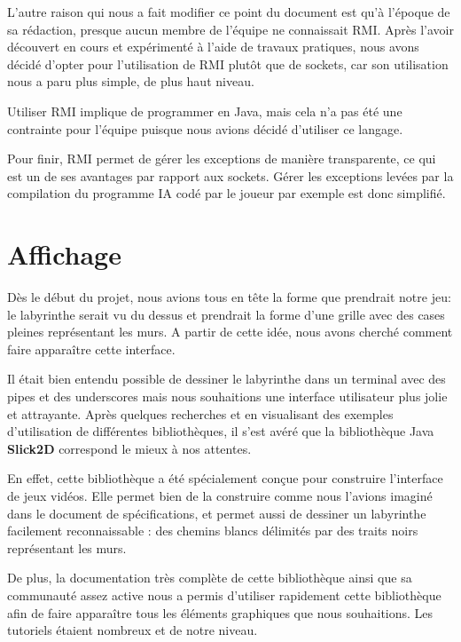 	L'autre raison qui nous a fait modifier ce point du document est qu'à l'époque de sa rédaction, presque aucun membre de l'équipe ne connaissait RMI. Après l'avoir découvert en cours et expérimenté à l'aide de travaux pratiques, nous avons décidé d'opter pour l'utilisation de RMI plutôt que de sockets, car son utilisation nous a paru plus simple, de plus haut niveau.

	Utiliser RMI implique de programmer en Java, mais cela n'a pas été une contrainte pour l'équipe puisque nous avions décidé d'utiliser ce langage.

	Pour finir, RMI permet de gérer les exceptions de manière transparente, ce qui est un de ses avantages par rapport aux sockets. Gérer les exceptions levées par la compilation du programme IA codé par le joueur par exemple est donc simplifié.


\section{Affichage}

	Dès le début du projet, nous avions tous en tête la forme que prendrait notre jeu: le labyrinthe serait vu du dessus et prendrait la forme d'une grille avec des cases pleines représentant les murs. A partir de cette idée, nous avons cherché comment faire apparaître cette interface.

	Il était bien entendu possible de dessiner le labyrinthe dans un terminal avec des pipes et des underscores mais nous souhaitions une interface utilisateur plus jolie et attrayante. Après quelques recherches et en visualisant des exemples d'utilisation de différentes bibliothèques, il s'est avéré que la bibliothèque Java \textbf{Slick2D} correspond le mieux à nos attentes.

  En effet, cette bibliothèque a été spécialement conçue pour construire l'interface de jeux vidéos. Elle permet bien de la construire comme nous l'avions imaginé dans le document de spécifications, et permet aussi de dessiner un labyrinthe facilement reconnaissable : des chemins blancs délimités par des traits noirs représentant les murs.

  De plus, la documentation très complète de cette bibliothèque ainsi que sa communauté assez active nous a permis d'utiliser rapidement cette bibliothèque afin de faire apparaître tous les éléments graphiques que nous souhaitions. Les tutoriels étaient nombreux et de notre niveau.
